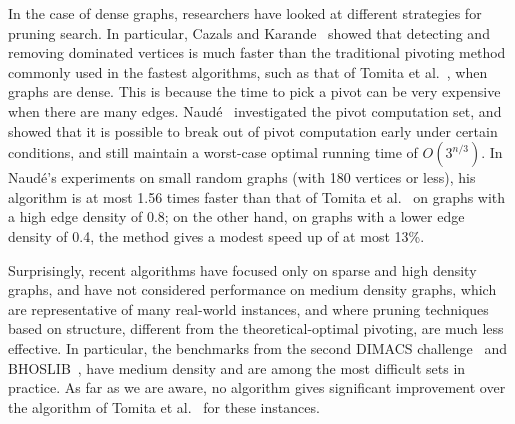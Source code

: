 \documentclass[final,1p]{elsarticle-modified}
\begin{document}
In the case of dense graphs, researchers have looked at different strategies for pruning search. In particular, Cazals and Karande~\cite{cazals-karande-2006} showed that detecting and removing dominated vertices is much faster than the traditional pivoting method commonly used in the fastest algorithms, such as that of Tomita et al.~\cite{tomita-2006}, when graphs are dense. This is because the time to pick a pivot can be very expensive when there are many edges. Naud\'e~\cite{naude-2016} investigated the pivot computation set, and showed that it is possible to break out of pivot computation early under certain conditions, and still maintain a worst-case optimal running time of $O(3^{n/3})$. In Naud\'e's experiments on small random graphs (with 180 vertices or less), his algorithm is at most 1.56 times faster than that of Tomita et al.~\cite{tomita-2006} on graphs with a high edge density of 0.8; on the other hand, on graphs with a lower edge density of 0.4, the method gives a modest speed up of at most 13\%.


Surprisingly, recent algorithms have focused only on sparse and high density graphs, and have not considered performance on medium density graphs, which are representative of many real-world instances, and where pruning techniques based on structure, different from the theoretical-optimal pivoting, are much less effective. In particular, the benchmarks from the second DIMACS challenge~\cite{johnson1996} and BHOSLIB~\cite{bhoslib}, have medium density and are among the most difficult sets in practice. As far as we are aware, no algorithm gives significant improvement over the algorithm of Tomita et al.~\cite{tomita-2006} for these instances.
\end{document}
